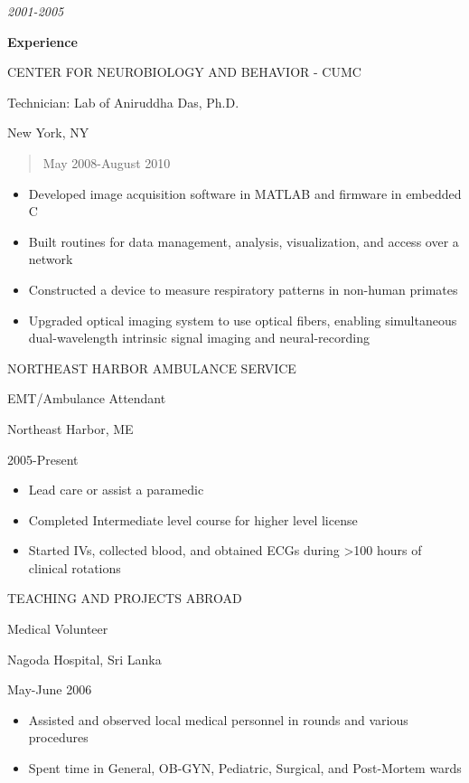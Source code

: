 \emph{2001-2005}

\textbf{Experience}

CENTER FOR NEUROBIOLOGY AND BEHAVIOR - CUMC

Technician: Lab of Aniruddha Das, Ph.D.

New York, NY

\begin{quote}
May 2008-August 2010
\end{quote}

\begin{itemize}
\item
  Developed image acquisition software in MATLAB and firmware in
  embedded C
\item
  Built routines for data management, analysis, visualization, and
  access over a network
\item
  Constructed a device to measure respiratory patterns in non-human
  primates
\item
  Upgraded optical imaging system to use optical fibers, enabling
  simultaneous dual-wavelength intrinsic signal imaging and
  neural-recording
\end{itemize}

NORTHEAST HARBOR AMBULANCE SERVICE

EMT/Ambulance Attendant

Northeast Harbor, ME

2005-Present

\begin{itemize}
\item
  Lead care or assist a paramedic
\item
  Completed Intermediate level course for higher level license
\item
  Started IVs, collected blood, and obtained ECGs during \textgreater100
  hours of clinical rotations
\end{itemize}

TEACHING AND PROJECTS ABROAD

Medical Volunteer

Nagoda Hospital, Sri Lanka

May-June 2006

\begin{itemize}
\item
  Assisted and observed local medical personnel in rounds and various
  procedures
\item
  Spent time in General, OB-GYN, Pediatric, Surgical, and Post-Mortem
  wards
\end{itemize}

